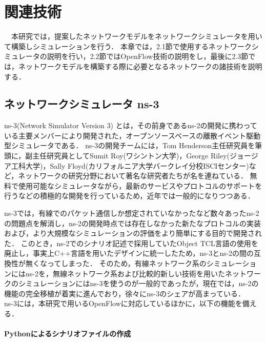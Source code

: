 \chapter{関連技術}

　本研究では，提案したネットワークモデルをネットワークシミュレータを用いて構築しシミュレーションを行う．
本章では，2.1節で使用するネットワークシミュレータの説明を行い，2.2節ではOpenFlow技術の説明をし，最後に2.3節では，ネットワークモデルを構築する際に必要となるネットワークの諸技術を説明する．

\section{ネットワークシミュレータ ns-3}

ns-3(Network Simulator Version 3)\cite{ns3} \cite{ns3text} とは，その前身であるns-2の開発に携わっている主要メンバーにより開発された，オープンソースベースの離散イベント駆動型シミュレータである．
ns-3の開発チームには，Tom Henderson主任研究員を筆頭に，副主任研究員としてSumit Roy(ワシントン大学)，George Riley(ジョージア工科大学)，Sally Floyd(カリフォルニア大学バークレイ分校ISCIセンター)など，ネットワークの研究分野において著名な研究者たちが名を連ねている．
無料で使用可能なシミュレータながら，最新のサービスやプロトコルのサポートを行うなどの積極的な開発を行っているため，近年では一般的になりつつある．

ns-3では，有線でのパケット通信しか想定されていなかったなど数々あったns-2の問題点を解消し，ns-2の開発時点では存在しなかった新たなプロトコルの実装および，より大規模なシミュレーションの評価をより簡単にする目的で開発された．
このとき，ns-2でのシナリオ記述で採用していたObject TCL言語の使用を廃止し，事実上C++言語を用いたデザインに統一したため，ns-3とns-2の間の互換性が無くなってしまった．
そのため，有線ネットワーク系のシミュレーションにはns-2を，無線ネットワーク系および比較的新しい技術を用いたネットワークのシミュレーションにはns-3を使うのが一般的であったが，現在では，ns-2の機能の完全移植が着実に進んでおり，徐々にns-3のシェアが高まっている． \\

ns-3には，本研究で用いるOpenFlowに対応しているほかに，以下の機能を備える．

\subsubsection{Pythonによるシナリオファイルの作成}

